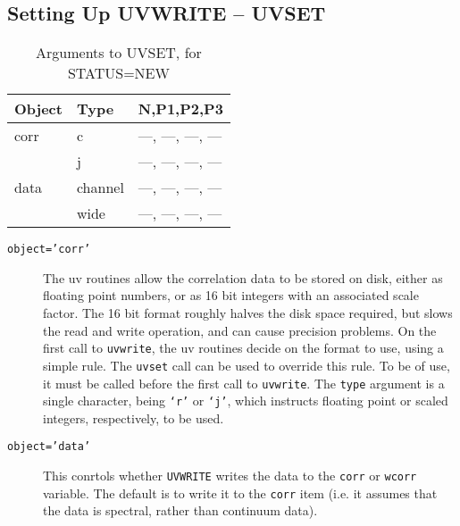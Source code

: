 \documentclass{report}
\begin{document}
\subsection{Setting Up UVWRITE -- UVSET}
\begin{table}\centering
\begin{tabular}{|l|l|l|}					   \hline
\bf Object	& \bf Type	& \bf N,P1,P2,P3		\\ \hline
 corr		& c		&  ---, ---, ---, ---		\\
		& j		&  ---, ---, ---, ---		\\
 data		& channel	&  ---, ---, ---, ---		\\
		& wide		&  ---, ---, ---, ---		\\ \hline
\end{tabular}
\caption{Arguments to UVSET, for STATUS=NEW}
\label{t:uvset-new}
\end{table}
\begin{description}
\item[\texttt{object='corr'}]
The uv routines allow the correlation data to be stored on disk, either
as floating point numbers, or as 16 bit integers with an associated scale
factor. The 16 bit format roughly halves the disk space required, but slows
the read and write operation, and can cause precision problems. On the
first call to {\tt uvwrite}, the uv routines decide on the format to
use, using a simple rule. The {\tt uvset} call
can be used to override this rule. To be of use, it must be called before
the first call to {\tt uvwrite}. The {\tt type} argument is a single
character, being {\tt `r'} or {\tt `j'}, which instructs floating
point or scaled integers, respectively, to be used.
\item[\texttt{object='data'}] This conrtols whether {\tt UVWRITE} writes the
data to the {\tt corr} or {\tt wcorr} variable. The default is to write it
to the {\tt corr} item (i.e. it assumes that the data is spectral, rather
than continuum data).
\end{description}
\end{document}

